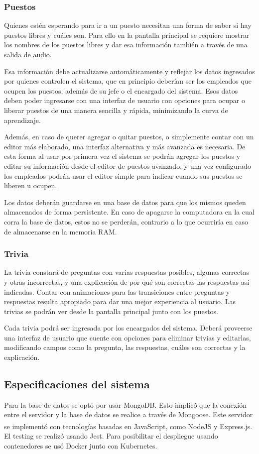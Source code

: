 \documentclass{article}
\begin{document}
\subsubsection{Puestos}
Quienes estén esperando para ir a un puesto necesitan una forma de saber si hay puestos libres y cuáles son. Para ello en la pantalla principal se requiere mostrar los nombres de los puestos libres y dar esa información también a través de una salida de audio.

Esa información debe actualizarse automáticamente y reflejar los datos ingresados por quienes controlen el sistema, que en principio deberían ser los empleados que ocupen los puestos, además de su jefe o el encargado del sistema. Esos datos deben poder ingresarse con una interfaz de usuario con opciones para ocupar o liberar puestos de una manera sencilla y rápida, minimizando la curva de aprendizaje. 

Además, en caso de querer agregar o quitar puestos, o simplemente contar con un editor más elaborado, una interfaz alternativa y más avanzada es necesaria. De esta forma al usar por primera vez el sistema se podrán agregar los puestos y editar su información desde el editor de puestos avanzado, y una vez configurado los empleados podrán usar el editor simple para indicar cuando sus puestos se liberen u ocupen.

Los datos deberán guardarse en una base de datos para que los mismos queden almacenados de forma persistente. En caso de apagarse la computadora en la cual corra la base de datos, estos no se perderán, contrario a lo que ocurriría en caso de almacenarse en la memoria RAM.
\subsubsection{Trivia}
La trivia constará de preguntas con varias respuestas posibles, algunas correctas y otras incorrectas, y una explicación de por qué son correctas las respuestas así indicadas. Contar con animaciones para las transiciones entre preguntas y respuestas resulta apropiado para dar una mejor experiencia al usuario. Las trivias se podrán ver desde la pantalla principal junto con los puestos.

Cada trivia podrá ser ingresada por los encargados del sistema. Deberá proveerse una interfaz de usuario que cuente con opciones para eliminar trivias y editarlas, modificando campos como la pregunta, las respuestas, cuáles son correctas y la explicación.
\newpage
\subsection{Especificaciones del sistema}
Para la base de datos se optó por usar MongoDB. Esto implicó que la conexión entre el servidor y la base de datos se realice a través de Mongoose. Este servidor se implementó con tecnologías basadas en JavaScript, como NodeJS\textsuperscript{\textregistered} y Express.js. El testing se realizó usando Jest. Para posibilitar el despliegue usando contenedores se usó Docker junto con Kubernetes.
\end{document}
